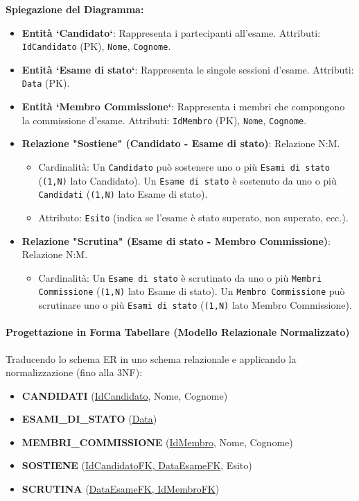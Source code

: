 \textbf{Spiegazione del Diagramma:}
\begin{itemize}
    \item \textbf{Entità `Candidato`}: Rappresenta i partecipanti all'esame. Attributi: \lstinline{IdCandidato} (PK), \lstinline{Nome}, \lstinline{Cognome}.
    \item \textbf{Entità `Esame di stato`}: Rappresenta le singole sessioni d'esame. Attributi: \lstinline{Data} (PK).
    \item \textbf{Entità `Membro Commissione`}: Rappresenta i membri che compongono la commissione d'esame. Attributi: \lstinline{IdMembro} (PK), \lstinline{Nome}, \lstinline{Cognome}.
    \item \textbf{Relazione "Sostiene" (Candidato - Esame di stato)}: Relazione N:M.
    \begin{itemize}
        \item Cardinalità: Un \lstinline{Candidato} può sostenere uno o più \lstinline{Esami di stato} (\lstinline{(1,N)} lato Candidato). Un \lstinline{Esame di stato} è sostenuto da uno o più \lstinline{Candidati} (\lstinline{(1,N)} lato Esame di stato).
        \item Attributo: \lstinline{Esito} (indica se l'esame è stato superato, non superato, ecc.).
    \end{itemize}
    \item \textbf{Relazione "Scrutina" (Esame di stato - Membro Commissione)}: Relazione N:M.
    \begin{itemize}
        \item Cardinalità: Un \lstinline{Esame di stato} è scrutinato da uno o più \lstinline{Membri Commissione} (\lstinline{(1,N)} lato Esame di stato). Un \lstinline{Membro Commissione} può scrutinare uno o più \lstinline{Esami di stato} (\lstinline{(1,N)} lato Membro Commissione).
    \end{itemize}
\end{itemize}

\paragraph{Progettazione in Forma Tabellare (Modello Relazionale Normalizzato)}
Traducendo lo schema ER in uno schema relazionale e applicando la normalizzazione (fino alla 3NF):

\begin{itemize}
    \item \textbf{CANDIDATI} (\underline{IdCandidato}, Nome, Cognome)
    \item \textbf{ESAMI\_DI\_STATO} (\underline{Data})
    \item \textbf{MEMBRI\_COMMISSIONE} (\underline{IdMembro}, Nome, Cognome)
    \item \textbf{SOSTIENE} (\underline{IdCandidatoFK, DataEsameFK}, Esito)
    \item \textbf{SCRUTINA} (\underline{DataEsameFK, IdMembroFK})
\end{itemize}

